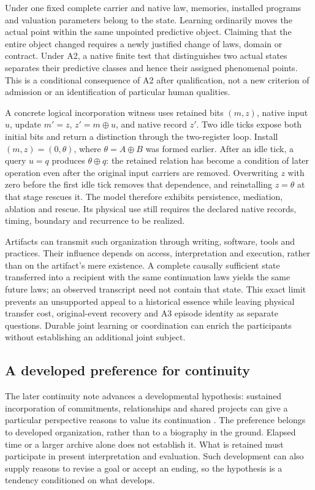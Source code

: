 Under one fixed complete carrier and native law, memories, installed programs and valuation parameters belong to the state. Learning ordinarily moves the actual point within the same unpointed predictive object. Claiming that the entire object changed requires a newly justified change of laws, domain or contract. Under A2, a native finite test that distinguishes two actual states separates their predictive classes and hence their assigned phenomenal points. This is a conditional consequence of A2 after qualification, not a new criterion of admission or an identification of particular human qualities.

A concrete logical incorporation witness uses retained bits $(m,z)$, native input $u$, update $m'=z$, $z'=m\oplus u$, and native record $z'$. Two idle ticks expose both initial bits and return a distinction through the two-register loop. Install $(m,z)=(0,\theta)$, where $\theta=A\oplus B$ was formed earlier. After an idle tick, a query $u=q$ produces $\theta\oplus q$: the retained relation has become a condition of later operation even after the original input carriers are removed. Overwriting $z$ with zero before the first idle tick removes that dependence, and reinstalling $z=\theta$ at that stage rescues it. The model therefore exhibits persistence, mediation, ablation and rescue. Its physical use still requires the declared native records, timing, boundary and recurrence to be realized.

Artifacts can transmit such organization through writing, software, tools and practices. Their influence depends on access, interpretation and execution, rather than on the artifact's mere existence. A complete causally sufficient state transferred into a recipient with the same continuation laws yields the same future laws; an observed transcript need not contain that state. This exact limit prevents an unsupported appeal to a historical essence while leaving physical transfer cost, original-event recovery and A3 episode identity as separate questions. Durable joint learning or coordination can enrich the participants without establishing an additional joint subject.

\subsection{A developed preference for continuity}
The later continuity note advances a developmental hypothesis: sustained incorporation of commitments, relationships and shared projects can give a particular perspective reasons to value its continuation \cite{RodgersContinuity2026}. The preference belongs to developed organization, rather than to a biography in the ground. Elapsed time or a larger archive alone does not establish it. What is retained must participate in present interpretation and evaluation. Such development can also supply reasons to revise a goal or accept an ending, so the hypothesis is a tendency conditioned on what develops.

